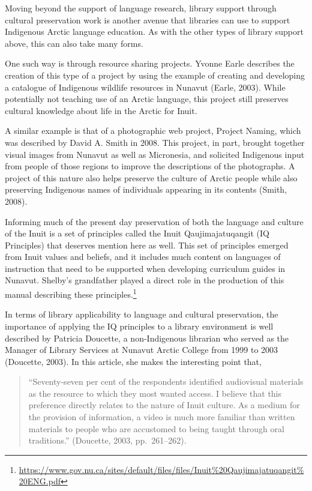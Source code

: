 \documentclass[a4paper,
fontsize=11pt,
oneside,
numbers=noperiodatend,
parskip=half-,
bibliography=totoc,
final
]{scrartcl}
\begin{document}
Moving beyond the support of language research, library support through
cultural preservation work is another avenue that libraries can use to
support Indigenous Arctic language education. As with the other types of
library support above, this can also take many forms.

One such way is through resource sharing projects. Yvonne Earle
describes the creation of this type of a project by using the example of
creating and developing a catalogue of Indigenous wildlife resources in
Nunavut (Earle, 2003). While potentially not teaching use of an Arctic
language, this project still preserves cultural knowledge about life in
the Arctic for Inuit.

A similar example is that of a photographic web project, Project Naming,
which was described by David A. Smith in 2008. This project, in part,
brought together visual images from Nunavut as well as Micronesia, and
solicited Indigenous input from people of those regions to improve the
descriptions of the photographs. A project of this nature also helps
preserve the culture of Arctic people while also preserving Indigenous
names of individuals appearing in its contents (Smith, 2008).

Informing much of the present day preservation of both the language and
culture of the Inuit is a set of principles called the Inuit
Qaujimajatuqangit (IQ Principles) that deserves mention here as well.
This set of principles emerged from Inuit values and beliefs, and it
includes much content on languages of instruction that need to be
supported when developing curriculum guides in Nunavut. Shelby's
grandfather played a direct role in the production of this manual
describing these principles.\footnote{\url{https://www.gov.nu.ca/sites/default/files/files/Inuit\%20Qaujimajatuqangit\%20ENG.pdf}}

In terms of library applicability to language and cultural preservation,
the importance of applying the IQ principles to a library environment is
well described by Patricia Doucette, a non-Indigenous librarian who
served as the Manager of Library Services at Nunavut Arctic College from
1999 to 2003 (Doucette, 2003). In this article, she makes the
interesting point that,

\begin{quote}
\enquote{Seventy-seven per cent of the respondents identified
audiovisual materials as the resource to which they most wanted access.
I believe that this preference directly relates to the nature of Inuit
culture. As a medium for the provision of information, a video is much
more familiar than written materials to people who are accustomed to
being taught through oral traditions.} (Doucette, 2003, pp.~261--262).
\end{quote}
\end{document}
